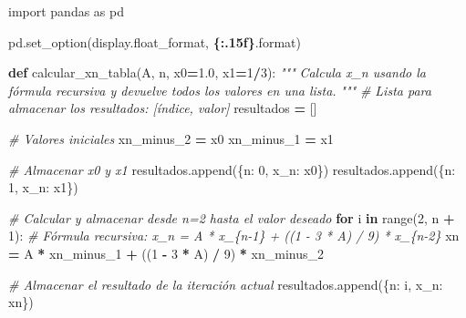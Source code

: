 \documentclass[
]{article}
\newenvironment{Shaded}{\begin{snugshade}}{\end{snugshade}}
\newcommand{\BuiltInTok}[1]{#1}
\newcommand{\CommentTok}[1]{\textcolor[rgb]{0.56,0.35,0.01}{\textit{#1}}}
\newcommand{\ControlFlowTok}[1]{\textcolor[rgb]{0.13,0.29,0.53}{\textbf{#1}}}
\newcommand{\DecValTok}[1]{\textcolor[rgb]{0.00,0.00,0.81}{#1}}
\newcommand{\FloatTok}[1]{\textcolor[rgb]{0.00,0.00,0.81}{#1}}
\newcommand{\ImportTok}[1]{#1}
\newcommand{\KeywordTok}[1]{\textcolor[rgb]{0.13,0.29,0.53}{\textbf{#1}}}
\newcommand{\NormalTok}[1]{#1}
\newcommand{\OperatorTok}[1]{\textcolor[rgb]{0.81,0.36,0.00}{\textbf{#1}}}
\newcommand{\SpecialCharTok}[1]{\textcolor[rgb]{0.81,0.36,0.00}{\textbf{#1}}}
\newcommand{\StringTok}[1]{\textcolor[rgb]{0.31,0.60,0.02}{#1}}
\begin{document}
\begin{Shaded}
\begin{Highlighting}[]
\ImportTok{import}\NormalTok{ pandas }\ImportTok{as}\NormalTok{ pd}

\NormalTok{pd.set\_option(}\StringTok{\textquotesingle{}display.float\_format\textquotesingle{}}\NormalTok{, }\StringTok{\textquotesingle{}}\SpecialCharTok{\{:.15f\}}\StringTok{\textquotesingle{}}\NormalTok{.}\BuiltInTok{format}\NormalTok{)}

\KeywordTok{def}\NormalTok{ calcular\_xn\_tabla(A, n, x0}\OperatorTok{=}\FloatTok{1.0}\NormalTok{, x1}\OperatorTok{=}\DecValTok{1}\OperatorTok{/}\DecValTok{3}\NormalTok{):}
    \CommentTok{"""}
\CommentTok{    Calcula x\_n usando la fórmula recursiva y devuelve todos los valores en una lista.}
\CommentTok{    """}
    \CommentTok{\# Lista para almacenar los resultados: [índice, valor]}
\NormalTok{    resultados }\OperatorTok{=}\NormalTok{ []}
    
    \CommentTok{\# Valores iniciales}
\NormalTok{    xn\_minus\_2 }\OperatorTok{=}\NormalTok{ x0}
\NormalTok{    xn\_minus\_1 }\OperatorTok{=}\NormalTok{ x1}
    
    \CommentTok{\# Almacenar x0 y x1}
\NormalTok{    resultados.append(\{}\StringTok{\textquotesingle{}n\textquotesingle{}}\NormalTok{: }\DecValTok{0}\NormalTok{, }\StringTok{\textquotesingle{}x\_n\textquotesingle{}}\NormalTok{: x0\})}
\NormalTok{    resultados.append(\{}\StringTok{\textquotesingle{}n\textquotesingle{}}\NormalTok{: }\DecValTok{1}\NormalTok{, }\StringTok{\textquotesingle{}x\_n\textquotesingle{}}\NormalTok{: x1\})}
    
    \CommentTok{\# Calcular y almacenar desde n=2 hasta el valor deseado}
    \ControlFlowTok{for}\NormalTok{ i }\KeywordTok{in} \BuiltInTok{range}\NormalTok{(}\DecValTok{2}\NormalTok{, n }\OperatorTok{+} \DecValTok{1}\NormalTok{):}
        \CommentTok{\# Fórmula recursiva: x\_n = A * x\_\{n{-}1\} + ((1 {-} 3 * A) / 9) * x\_\{n{-}2\}}
\NormalTok{        xn }\OperatorTok{=}\NormalTok{ A }\OperatorTok{*}\NormalTok{ xn\_minus\_1 }\OperatorTok{+}\NormalTok{ ((}\DecValTok{1} \OperatorTok{{-}} \DecValTok{3} \OperatorTok{*}\NormalTok{ A) }\OperatorTok{/} \DecValTok{9}\NormalTok{) }\OperatorTok{*}\NormalTok{ xn\_minus\_2}
        
        \CommentTok{\# Almacenar el resultado de la iteración actual}
\NormalTok{        resultados.append(\{}\StringTok{\textquotesingle{}n\textquotesingle{}}\NormalTok{: i, }\StringTok{\textquotesingle{}x\_n\textquotesingle{}}\NormalTok{: xn\})}
        

\end{Highlighting}
\end{Shaded}
\end{document}
